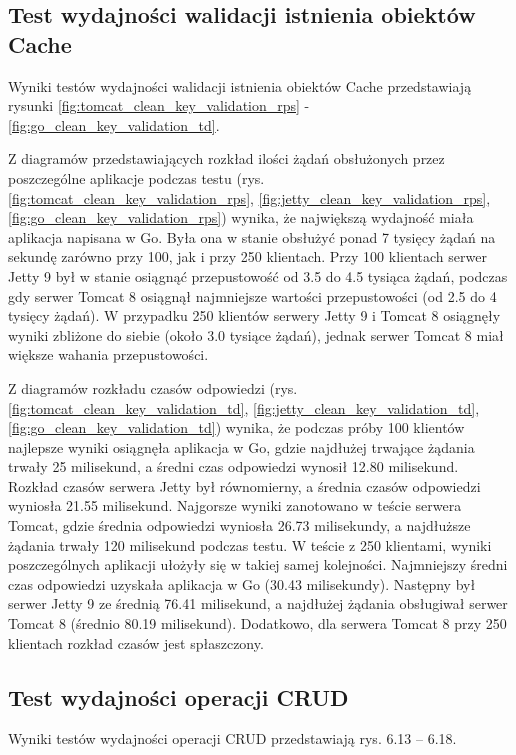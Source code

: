 % 
\clearpage

\subsection{Test wydajności walidacji istnienia obiektów Cache}
Wyniki testów wydajności walidacji istnienia obiektów Cache przedstawiają rysunki \ref{fig:tomcat_clean_key_validation_rps} - \ref{fig:go_clean_key_validation_td}.              

Z diagramów przedstawiających rozkład  ilości żądań obsłużonych przez poszczególne aplikacje podczas testu (rys. \ref{fig:tomcat_clean_key_validation_rps}, \ref{fig:jetty_clean_key_validation_rps}, \ref{fig:go_clean_key_validation_rps}) wynika, że największą wydajność miała aplikacja napisana w Go. Była ona w stanie obsłużyć ponad 7 tysięcy żądań na sekundę zarówno przy 100, jak i przy 250 klientach. Przy 100 klientach serwer Jetty 9 był w stanie osiągnąć przepustowość od 3.5 do 4.5 tysiąca żądań, podczas gdy serwer Tomcat 8 osiągnął najmniejsze wartości przepustowości (od 2.5 do 4 tysięcy żądań). W przypadku 250 klientów serwery Jetty 9 i Tomcat 8 osiągnęły wyniki zbliżone do siebie  (około 3.0 tysiące żądań),  jednak  serwer Tomcat 8 miał większe wahania przepustowości.

Z diagramów rozkładu czasów odpowiedzi (rys. \ref{fig:tomcat_clean_key_validation_td}, \ref{fig:jetty_clean_key_validation_td}, \ref{fig:go_clean_key_validation_td}) wynika, że podczas próby 100 klientów najlepsze wyniki osiągnęła aplikacja w Go, gdzie najdłużej trwające żądania trwały 25 milisekund, a średni czas odpowiedzi wynosił  12.80 milisekund. Rozkład czasów serwera Jetty był równomierny, a średnia czasów odpowiedzi wyniosła 21.55 milisekund. Najgorsze wyniki zanotowano w teście serwera Tomcat, gdzie średnia odpowiedzi wyniosła 26.73 milisekundy, a najdłuższe żądania trwały 120 milisekund podczas testu. W teście z 250 klientami, wyniki poszczególnych aplikacji ułożyły się w takiej samej kolejności. Najmniejszy  średni czas odpowiedzi  uzyskała  aplikacja w Go (30.43 milisekundy). Następny był serwer Jetty 9 ze średnią 76.41 milisekund, a najdłużej żądania obsługiwał serwer Tomcat 8 (średnio 80.19 milisekund). Dodatkowo, dla serwera Tomcat 8 przy 250 klientach rozkład czasów jest spłaszczony. 
% 
\clearpage

\subsection{Test wydajności operacji CRUD}
Wyniki testów wydajności operacji CRUD przedstawiają  rys. 6.13 – 6.18.

